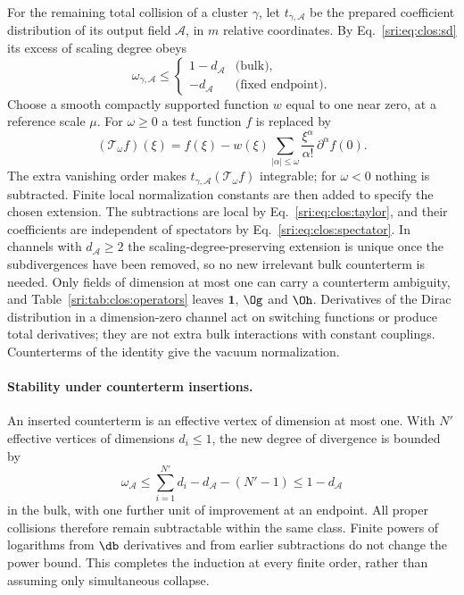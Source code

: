 For the remaining total collision of a cluster $\gamma$, let $t_{\gamma,\mathcal A}$ be the prepared coefficient
distribution of its output field $\mathcal A$, in $m$ relative coordinates. By Eq.~\eqref{sri:eq:clos:sd} its excess of
scaling degree obeys
\begin{equation}
 \omega_{\gamma,\mathcal A}\le
 \begin{cases}1-d_{\mathcal A}&\text{(bulk)},\\ -d_{\mathcal A}&\text{(fixed endpoint)}.\end{cases}
\end{equation}
Choose a smooth compactly supported function $w$ equal to one near zero, at a reference scale $\mu$. For
$\omega\ge0$ a test function $f$ is replaced by
\begin{equation}
 (\mathcal T_\omega f)(\xi)=f(\xi)-w(\xi)\sum_{|\alpha|\le\omega}\frac{\xi^\alpha}{\alpha!}\,\partial^\alpha f(0).
 \label{sri:eq:clos:taylor}
\end{equation}
The extra vanishing order makes $t_{\gamma,\mathcal A}(\mathcal T_\omega f)$ integrable; for $\omega<0$ nothing is
subtracted. Finite local normalization constants are then added to specify the chosen extension. The subtractions are
local by Eq.~\eqref{sri:eq:clos:taylor}, and their coefficients are independent of spectators by
Eq.~\eqref{sri:eq:clos:spectator}. In channels with $d_{\mathcal A}\ge2$ the scaling-degree-preserving extension is unique
once the subdivergences have been removed, so no new irrelevant bulk counterterm is needed. Only fields of dimension at
most one can carry a counterterm ambiguity, and Table~\ref{sri:tab:clos:operators} leaves $\mathbf 1$, $\Og$ and $\Oh$.
Derivatives of the Dirac distribution in a dimension-zero channel act on switching functions or produce total
derivatives; they are not extra bulk interactions with constant couplings. Counterterms of the identity give the
vacuum normalization.

\paragraph{Stability under counterterm insertions.} An inserted counterterm is an effective vertex of dimension at most
one. With $N'$ effective vertices of dimensions $d_i\le1$, the new degree of divergence is bounded by
\begin{equation}
 \omega_{\mathcal A}\le\sum_{i=1}^{N'}d_i-d_{\mathcal A}-(N'-1)\le1-d_{\mathcal A}
\end{equation}
in the bulk, with one further unit of improvement at an endpoint. All proper collisions therefore remain subtractable
within the same class. Finite powers of logarithms from $\db$ derivatives and from earlier subtractions do not change
the power bound. This completes the induction at every finite order, rather than assuming only simultaneous collapse.

